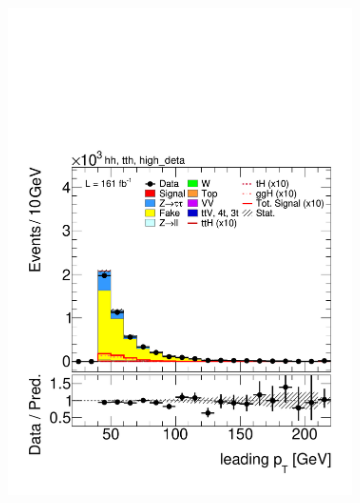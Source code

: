     \begin{figure}[htbp]
      \centering
      \begin{subfigure}[b]{0.45\textwidth}
        \centering
        \includegraphics[width=\textwidth]{images/using_highdeta_ffs_run3_inclusive_withscaling/plot_tau_0_pt_hh_tth_22_23_24_high_deta.pdf}
        \caption{}
      \end{subfigure}
      \hfill
      \begin{subfigure}[b]{0.45\textwidth}
        \centering

\end{subfigure}
\end{figure}
